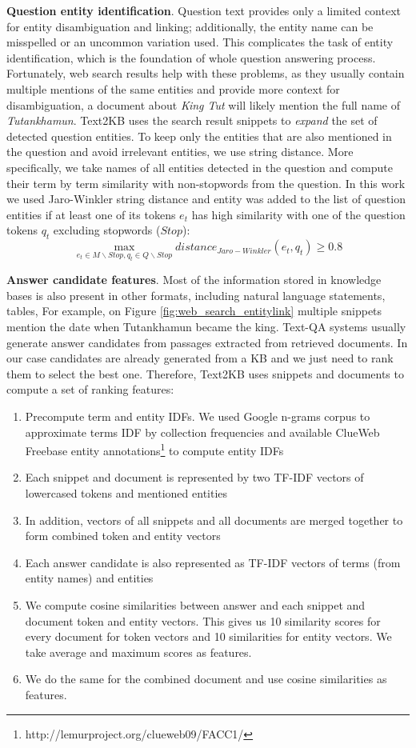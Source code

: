 \textbf{Question entity identification}.
Question text provides only a limited context for entity disambiguation and linking; additionally, the entity name can be misspelled or an uncommon variation used.
This complicates the task of entity identification, which is the foundation of whole question answering process.
Fortunately, web search results help with these problems, as they usually contain multiple mentions of the same entities and provide more context for disambiguation, \eg a document about \textit{King Tut} will likely mention the full name of \textit{Tutankhamun}.
Text2KB uses the search result snippets to \textit{expand} the set of detected question entities.
To keep only the entities that are also mentioned in the question and avoid irrelevant entities, we use string distance.
More specifically, we take names of all entities detected in the question and compute their term by term similarity with non-stopwords from the question.
In this work we used Jaro-Winkler string distance and entity was added to the list of question entities if at least one of its tokens $e_t$ has high similarity with one of the question tokens $q_t$ excluding stopwords ($Stop$):
$$\max_{e_t \in M\backslash Stop, q_t \in Q\backslash Stop} distance_{Jaro-Winkler}(e_t, q_t) \geq 0.8$$

\textbf{Answer candidate features}.
Most of the information stored in knowledge bases is also present in other formats, including natural language statements, tables, \etc
For example, on Figure \ref{fig:web_search_entitylink} multiple snippets mention the date when Tutankhamun became the king.
Text-QA systems usually generate answer candidates from passages extracted from retrieved documents.
In our case candidates are already generated from a KB and we just need to rank them to select the best one.
Therefore, Text2KB uses snippets and documents to compute a set of ranking features:

\vspace{-0.2cm}
\begin{enumerate}
\setlength\itemsep{-0.5em}
\item Precompute term and entity IDFs. We used Google n-grams corpus to approximate terms IDF by collection frequencies and available ClueWeb Freebase entity annotations\footnote{http://lemurproject.org/clueweb09/FACC1/} to compute entity IDFs
\item Each snippet and document is represented by two TF-IDF vectors of lowercased tokens and mentioned entities
\item In addition, vectors of all snippets and all documents are merged together to form combined token and entity vectors
\item Each answer candidate is also represented as TF-IDF vectors of terms (from entity names) and entities
\item We compute cosine similarities between answer and each snippet and document token and entity vectors. This gives us 10 similarity scores for every document for token vectors and 10 similarities for entity vectors. We take average and maximum scores as features.
\item We do the same for the combined document and use cosine similarities as features.
\end{enumerate}

